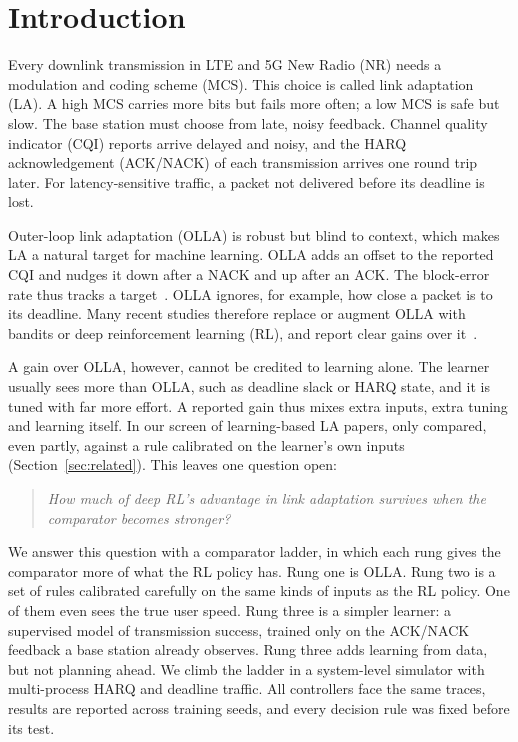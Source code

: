 \section{Introduction}\label{sec:intro}
Every downlink transmission in LTE and 5G New Radio (NR) needs a modulation and coding scheme (MCS). This choice is called link adaptation (LA). A high MCS carries more bits but fails more often; a low MCS is safe but slow. The base station must choose from late, noisy feedback. Channel quality indicator (CQI) reports arrive delayed and noisy, and the HARQ acknowledgement (ACK/NACK) of each transmission arrives one round trip later. For latency-sensitive traffic, a packet not delivered before its deadline is lost.

Outer-loop link adaptation (OLLA) is robust but blind to context, which makes LA a natural target for machine learning. OLLA adds an offset to the reported CQI and nudges it down after a NACK and up after an ACK. The block-error rate thus tracks a target~\cite{nakamura2002olla}. OLLA ignores, for example, how close a packet is to its deadline. Many recent studies therefore replace or augment OLLA with bandits or deep reinforcement learning (RL), and report clear gains over it~\cite{saxena2022tuningfree,ye2023drlla,you2026sim2real,wang2026lolla,kela2022delayolla,demirel2025genrl}.

A gain over OLLA, however, cannot be credited to learning alone. The learner usually sees more than OLLA, such as deadline slack or HARQ state, and it is tuned with far more effort. A reported gain thus mixes extra inputs, extra tuning and learning itself. In our screen of \NLitN{} learning-based LA papers, only \NLitCalPart{} compared, even partly, against a rule calibrated on the learner's own inputs (Section~\ref{sec:related}). This leaves one question open:
\begin{quote}
\emph{How much of deep RL's advantage in link adaptation survives when the comparator becomes stronger?}
\end{quote}

We answer this question with a comparator ladder, in which each rung gives the comparator more of what the RL policy has. Rung one is OLLA. Rung two is a set of rules calibrated carefully on the same kinds of inputs as the RL policy. One of them even sees the true user speed. Rung three is a simpler learner: a supervised model of transmission success, trained only on the ACK/NACK feedback a base station already observes. Rung three adds learning from data, but not planning ahead. We climb the ladder in a system-level simulator with multi-process HARQ and deadline traffic. All controllers face the same traces, results are reported across training seeds, and every decision rule was fixed before its test.

